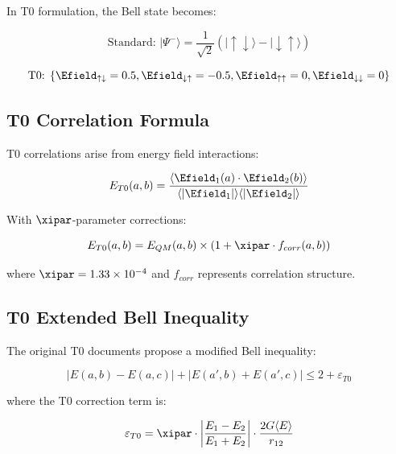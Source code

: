 	In T0 formulation, the Bell state becomes:
	
	\begin{equation}
		\text{Standard: } |\Psi^-\rangle = \frac{1}{\sqrt{2}}(|\uparrow\downarrow\rangle - |\downarrow\uparrow\rangle)
	\end{equation}
	
	\begin{equation}
		\text{T0: } \{\Efield_{\uparrow\downarrow} = 0.5, \Efield_{\downarrow\uparrow} = -0.5, \Efield_{\uparrow\uparrow} = 0, \Efield_{\downarrow\downarrow} = 0\}
	\end{equation}
	
	\subsection{T0 Correlation Formula}
	
	T0 correlations arise from energy field interactions:
	
	\begin{equation}
		E_{T0}(a,b) = \frac{\langle \Efield_1(a) \cdot \Efield_2(b) \rangle}{\langle |\Efield_1| \rangle \langle |\Efield_2| \rangle}
	\end{equation}
	
	With $\xipar$-parameter corrections:
	
	\begin{equation}
		E_{T0}(a,b) = E_{QM}(a,b) \times (1 + \xipar \cdot f_{corr}(a,b))
	\end{equation}
	
	where $\xipar = 1.33 \times 10^{-4}$ and $f_{corr}$ represents correlation structure.
	
	\subsection{T0 Extended Bell Inequality}
	
	The original T0 documents propose a modified Bell inequality:
	
	\begin{equation}
		|E(a,b) - E(a,c)| + |E(a',b) + E(a',c)| \leq 2 + \varepsilon_{T0}
	\end{equation}
	
	where the T0 correction term is:
	
	\begin{equation}
		\varepsilon_{T0} = \xipar \cdot \left|\frac{E_1 - E_2}{E_1 + E_2}\right| \cdot \frac{2G\langle E \rangle}{r_{12}}
	\end{equation}
	
